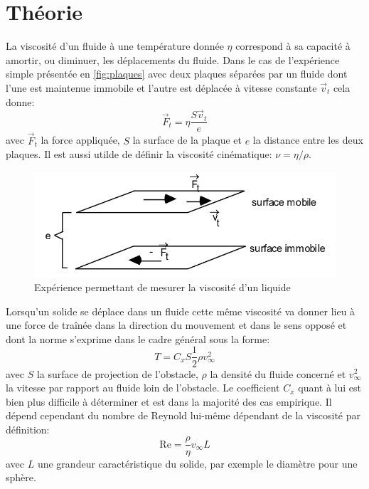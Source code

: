 \section{Théorie}
La viscosité d'un fluide à une température donnée $\eta$ correspond à sa capacité à amortir, ou diminuer, les déplacements du fluide. Dans le cas de l'expérience simple présentée en \autoref{fig:plaques} avec deux plaques séparées par un fluide dont l'une est maintenue immobile et l'autre est déplacée à vitesse constante $\vec{v}_t$ cela donne:
\begin{equation}
    \vec{F}_t = \eta \frac{S\vec{v}_t}{e}
\end{equation} 
avec $\vec{F}_t$ la force appliquée, $S$ la surface de la plaque et $e$ la distance entre les deux plaques. Il est aussi utilde de définir la viscosité cinématique: $\nu = \eta/\rho$.

\begin{figure}[h]
    \centering
    \includegraphics[width=0.6\linewidth]{figures/viscosite_plaques.png}
    \caption{Expérience permettant de mesurer la viscosité d'un liquide \cite{notice}}
    \label{fig:plaques}
\end{figure}

Lorsqu'un solide se déplace dans un fluide cette même viscosité va donner lieu à une force de traînée dans la direction du mouvement et dans le sens opposé et dont la norme s'exprime dans le cadre général sous la forme:
\begin{equation}
    T = C_x S \frac{1}{2} \rho v_\infty ^2
    \label{eq:trainee_gen}
\end{equation}
avec $S$ la surface de projection de l'obstacle, $\rho$ la densité du fluide concerné et \(v_\infty ^2\) la vitesse par rapport au fluide loin de l'obstacle. Le coefficient $C_x$ quant à lui est bien plus difficile à déterminer et est dans la majorité des cas empirique. Il dépend cependant du nombre de Reynold lui-même dépendant de la viscosité par définition:
\begin{equation}
    \mathrm{Re} = \frac{\rho}{\eta}v_\infty L
\end{equation}
avec $L$ une grandeur caractéristique du solide, par exemple le diamètre pour une sphère.

